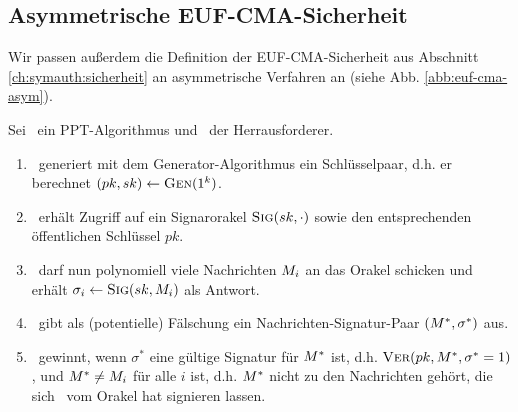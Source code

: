 \subsection{Asymmetrische EUF-CMA-Sicherheit} Wir passen außerdem die
Definition der EUF-CMA-Sicherheit aus Abschnitt
\ref{ch:symauth:sicherheit} an asymmetrische Verfahren an (siehe
Abb. \ref{abb:euf-cma-asym}).


\begin{definition}\indexEUFCMA Sei \A~ein PPT-Algorithmus und \C~der
  Herrausforderer.
  \begin{enumerate}
  \item \C~generiert mit dem Generator-Algorithmus ein Schlüsselpaar,
    d.h. er berechnet $(pk, sk) \leftarrow \textsc{Gen}(1^k)$.
  \item \A~erhält Zugriff auf ein Signarorakel $\textsc{Sig}(sk, \cdot)$ sowie den
    entsprechenden öffentlichen Schlüssel $pk$.
  \item \A~darf nun polynomiell viele Nachrichten $M_i$ an das
    Orakel schicken und erhält $\sigma_i \leftarrow \textsc{Sig}(sk, M_i)$ als
    Antwort.
  \item \A~gibt als (potentielle) Fälschung ein Nachrichten-Signatur-Paar
    $(M^*,\sigma^*)$ aus.
  \item \A~gewinnt, wenn $\sigma^*$ eine gültige Signatur für $M^*$
    ist, d.h. $\textsc{Ver}(pk, M^*, \sigma^* = 1)$, und $M^* \neq
    M_i$ für alle $i$ ist, d.h. $M^*$ nicht zu den Nachrichten
    gehört, die sich \A~vom Orakel hat signieren lassen.
  \end{enumerate}

  \begin{figure}
    \begin{center} 
\end{center}
\end{figure}
\end{definition}

